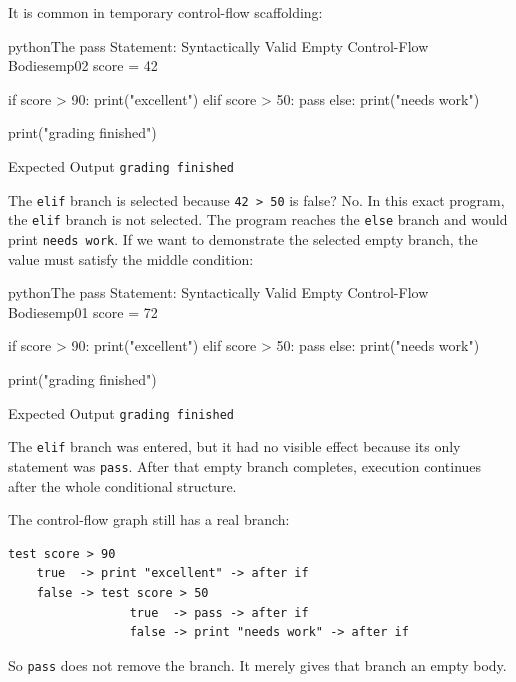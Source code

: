 \documentclass[a4paper,twoside]{report}
\begin{document}
It is common in temporary control-flow scaffolding:

\begin{codebox}[]{python}{The pass Statement: Syntactically Valid Empty Control-Flow Bodies}{emp02}
score = 42

if score > 90:
    print("excellent")
elif score > 50:
    pass
else:
    print("needs work")

print("grading finished")
\end{codebox}


\begin{iobox}{Expected Output}
\texttt{grading finished} \\
\end{iobox}


The \texttt{elif} branch is selected because \texttt{42 > 50} is false? No. In this exact program, the \texttt{elif} branch is not selected. The program reaches the \texttt{else} branch and would print \texttt{needs work}. If we want to demonstrate the selected empty branch, the value must satisfy the middle condition:

\begin{codebox}[]{python}{The pass Statement: Syntactically Valid Empty Control-Flow Bodies}{emp01}
score = 72

if score > 90:
    print("excellent")
elif score > 50:
    pass
else:
    print("needs work")

print("grading finished")
\end{codebox}


\begin{iobox}{Expected Output}
\texttt{grading finished} \\
\end{iobox}


The \texttt{elif} branch was entered, but it had no visible effect because its only statement was \texttt{pass}. After that empty branch completes, execution continues after the whole conditional structure.

The control-flow graph still has a real branch:

\begin{verbatim}
test score > 90
    true  -> print "excellent" -> after if
    false -> test score > 50
                 true  -> pass -> after if
                 false -> print "needs work" -> after if
\end{verbatim}

So \texttt{pass} does not remove the branch. It merely gives that branch an empty body.
\end{document}
